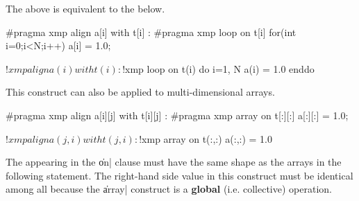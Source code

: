 The above is equivalent to the below.

\begin{XCexample}
#pragma xmp align a[i] with t[i]
  :
#pragma xmp loop on t[i]
for(int i=0;i<N;i++)
  a[i] = 1.0;
\end{XCexample}

\begin{XFexample}
!$xmp align a(i) with t(i)
  :
!$xmp loop on t(i)
do i=1, N
  a(i) = 1.0
enddo
\end{XFexample}

This construct can also be applied to multi-dimensional arrays.

\begin{XCexample}
#pragma xmp align a[i][j] with t[i][j]
  :
#pragma xmp array on t[:][:]
a[:][:] = 1.0;
\end{XCexample}

\begin{XFexample}
!$xmp align a(j,i) with t(j,i)
  :
!$xmp array on t(:,:)
a(:,:) = 1.0
\end{XFexample}

\begin{mynote}
  The {\template} appearing in the \|on| clause must have the same shape as
  the arrays in the following statement. The right-hand side value in
  this construct must be identical among all {\nodes} because the \|array|
  construct is a {\bf global} (i.e. collective) operation.
\end{mynote}
